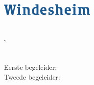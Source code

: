 \documentclass[10pt,a4paper,oneside]{report}
\title{\titel}
\author{\auteur}
\date{\datum}
\begin{document}
\begin{titlepage}

    \vspace*{-0.9cm}
    \hfill
    \includegraphics[width=0.35\textwidth]{windesheim} \\
    
    \begin{center}
    \vspace*{3cm}
    {\huge\thetitle}
    
    \vspace*{0.4cm}
    \textnormal{\ondertitel}
    \end{center}
    
    \vfill
    \raggedleft
    \theauthor \\
    \thedate, \plaats \\
    
    \vspace{\vertspace}
    \school \\
    \domein \\

    \vspace{\vertspace}
    Eerste begeleider: \begeleidereen \\
    Tweede begeleider: \begeleidertwee \\
    \organisatie \\

\end{titlepage}
\end{document}
